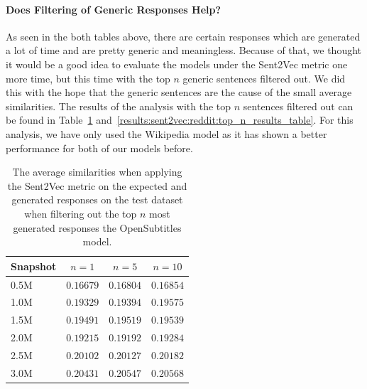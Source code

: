 \paragraph{Does Filtering of Generic Responses Help?} As seen in the both tables above, there are certain responses which are generated a lot of time and are pretty generic and meaningless. Because of that, we thought it would be a good idea to evaluate the models under the Sent2Vec metric one more time, but this time with the top $n$ generic sentences filtered out. We did this with the hope that the generic sentences are the cause of the small average similarities. The results of the analysis with the top $n$ sentences filtered out can be found in Table~\ref{results:sent2vec:opensubtitles:top_n_results_table} and~\ref{results:sent2vec:reddit:top_n_results_table}. For this analysis, we have only used the Wikipedia model as it has shown a better performance for both of our models before.
\\
\begin{table}[H]
	\centering
	\begin{adjustbox}{max width=\textwidth}
		\begin{tabular}{lccc}
			\toprule
			Snapshot & $n = 1$ & $n = 5$ & $n = 10$\\
			\midrule
			0.5M & $0.16679$ & $0.16804$ & $0.16854$\\
			1.0M & $0.19329$ & $0.19394$ & $0.19575$\\
			1.5M & $0.19491$ & $0.19519$ & $0.19539$\\
			2.0M & $0.19215$ & $0.19192$ & $0.19284$\\
			2.5M & $0.20102$ & $0.20127$ & $0.20182$\\
			3.0M & $0.20431$ & $0.20547$ & $0.20568$\\
			\bottomrule
		\end{tabular}
	\end{adjustbox}
	\caption{The average similarities when applying the Sent2Vec metric on the expected and generated responses on the test dataset when filtering out the top $n$ most generated responses the OpenSubtitles model.}
	\label{results:sent2vec:opensubtitles:top_n_results_table}
\end{table}

